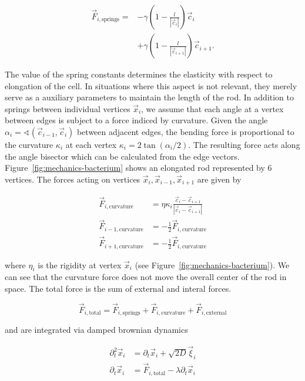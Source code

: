 \documentclass{article}
\begin{document}
\begin{align}
    \vec{F}_{i,\text{springs}} =
        &-\gamma\left(1 - \frac{l}{\left|\vec{c}_i\right|}\right)
        \vec{c}_i\\
        &+ \gamma\left(1 - \frac{l}{\left|\vec{c}_{i+1}\right|}\right)
        \vec{c}_{i+1}.
\end{align}

The value of the spring constants determines the elasticity with respect to elongation of the cell.
In situations where this aspect is not relevant, they merely serve as a auxiliary parameters to
maintain the length of the rod.
In addition to springs between individual vertices $\vec{x}_i$, we assume that each angle at a
vertex between edges is subject to a force indiced by curvature.
Given the angle $\alpha_i = \sphericalangle(\vec{c}_{i-1},\vec{c}_i)$ between adjacent edges,
the bending force is proportional to the curvature $\kappa_i$ at each vertex
$\kappa_i = 2\tan(\alpha_i/2)$.
The resulting force acts along the angle bisector which can be calculated from the edge vectors.
Figure~\ref{fig:mechanics-bacterium} shows an elongated rod represented by $6$ vertices.
The forces acting on vertices $\vec{x}_i,\vec{x}_{i-1},\vec{x}_{i+1}$ are given by

\begin{align}
    \vec{F}_{i,\text{curvature}} &= \eta\kappa_i
        \frac{\vec{c}_i - \vec{c}_{i+1}}{|\vec{c}_i-\vec{c}_{i+1}|}\\
    \vec{F}_{i-1,\text{curvature}} &= -\frac{1}{2}\vec{F}_{i,\text{curvature}}\\
    \vec{F}_{i+1,\text{curvature}} &= -\frac{1}{2}\vec{F}_{i,\text{curvature}}
\end{align}

where $\eta_i$ is the rigidity at vertex $\vec{x}_i$ (see Figure~\ref{fig:mechanics-bacterium}).
We can see that the curvature force does not move the overall center of the rod in space.
The total force is the sum of external and interal forces.

\begin{equation}
    \vec{F}_{i,\text{total}} = \vec{F}_{i,\text{springs}}+ \vec{F}_{i,\text{curvature}}
        + \vec{F}_{i,\text{external}}
\end{equation}

and are integrated via damped brownian dynamics

\begin{align}
    \partial_t^2 \vec{x}_i &= \partial_t\vec{x}_i + \sqrt{2D}\vec{\xi}_i\\
    \partial_t\vec{x}_i &= \vec{F}_{i,\text{total}} - \lambda \partial_t\vec{x}_i
\end{align}
\end{document}
